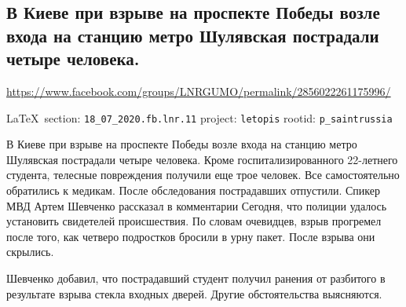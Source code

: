  
 
\subsection{В Киеве при взрыве на проспекте Победы возле входа на станцию метро Шулявская пострадали четыре человека.}
\url{https://www.facebook.com/groups/LNRGUMO/permalink/2856022261175996/}
  
\vspace{0.5cm}
{\small\LaTeX~section: \verb|18_07_2020.fb.lnr.11| project: \verb|letopis| rootid: \verb|p_saintrussia|}
\vspace{0.5cm}


В Киеве при взрыве на проспекте Победы возле входа на станцию метро Шулявская
пострадали четыре человека. Кроме госпитализированного 22-летнего студента,
телесные повреждения получили еще трое человек. Все самостоятельно обратились
к медикам. После обследования пострадавших отпустили.  Спикер МВД Артем
Шевченко рассказал в комментарии Сегодня, что полиции удалось установить
свидетелей происшествия. По словам очевидцев, взрыв прогремел после того, как
четверо подростков бросили в урну пакет. После взрыва они скрылись.

Шевченко добавил, что пострадавший студент получил ранения от разбитого в результате взрыва стекла входных дверей. Другие обстоятельства выясняются. 
